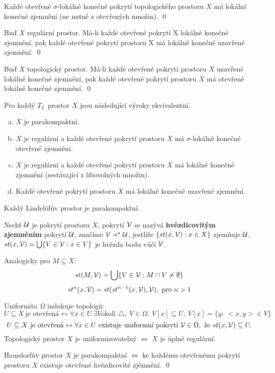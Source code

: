 \documentclass[12pt,a4paper]{article}
\newcommand{\head}[1]{\medskip\noindent {\bf #1}}
\newcommand\Hausd{$T_2$}
\begin{document}
\lemma[1] Každé otevřené $\sigma$-lokálně konečné pokrytí topologického
	prostoru $X$ má lokální konečné zjemnění (ne nutně z otevřených množin).
\dukaz \qed

\lemma[2] Buď $X$ regulární prostor. Má-li každé otevřené pokrytí X lokálně
	konečné zjemnění, pak každé otevřené pokrytí prostoru X má lokálně konečné
	uzavřené zjemnění.
\dukaz \qed

\lemma[3] Buď $X$ topologický prostor. Má-li každé otevřené pokrytí prostoru
	$X$ uzavřené lokálně konečné zjemnění, pak každé otevřené pokrytí prostoru
	$X$ má otevřené lokálně konečné zjemnění.
\dukaz \qed

\begin{veta}
Pro každý \Hausd~prostor $X$ jsou následující výroky ekvivalentní.
	\begin{enumerate}[(a)]
		\item $X$ je parakompaktní.
		\item $X$ je regulární a každé otevřené pokrytí prostoru $X$ má
			$\sigma$-lokálně konečné otevřené zjemnění.
		\item $X$ je regulární a každé otevřené pokrytí prostoru $X$ má lokálně
			konečné zjemnění (sestávající z libovolných množin).
		\item Každé otevřené pokrytí prostoru $X$ má lokálně konečné uzavřené
			zjemnění.
	\end{enumerate}
\end{veta}

\head {Důsledek:} Každý Lindelöfův prostor je parakompaktní.

 Nechť $\mathcal{ U }$ je pokrytí prostoru $X$, pokrytí $\mathcal{ V }$ se nazývá {\bf
	hvězdicovitým zjemněním} pokrytí $\mathcal{ U }$, značíme $\mathcal{ V } \prec^\star \mathcal{ U }$,
	jestliže $\{st(x,\mathcal{ V }) : x \in X\}$ zjemňuje $\mathcal{ U }$, $st(x, \mathcal{ V }) = \bigcup
	\{ V \in \mathcal{ V } : x \in V\}$ je hvězda bodu vůči $\mathcal{ V }$.

	Analogicky pro $M \subseteq X$:
		$$st(M, \mathcal{ V }) = \bigcup \{ V \in \mathcal{ V } : M \cap V \neq \emptyset \}$$
		$$st^n(x, \mathcal{ V }) = st(st^{n-1}(x, \mathcal{ V }), \mathcal{ V }),~\text{pro } n > 1$$

\head {Poznámka:} Uniformita $\Omega$ indukuje topologii:
	$$U \subseteq X~\text{je otevřená} \leftrightarrow \forall x \in U~\exists V \text{okolí } \triangle,~V \in \Omega,~V[x] \subseteq U,~V[x] = \{ y :~<x,y> \in V\}$$
	$$U \subseteq X~\text{je otevřená} \leftrightarrow \forall x \in U~\text{existuje uniformní pokrytí } \mathcal{ V } \in \Omega,\text{ že } st(x, \mathcal{ V }) \subseteq U.$$
	Topologický prostor $X$ je uniformizovatelný $\iff$ $X$ je úplně regulární.

\veta Hausdorfův prostor $X$ je parakompaktní $\iff$ ke každému otevřenému
	pokrytí prostoru $X$ existuje otevřené hvězdicovíté zjěmnění.
\dukaz \qed
\end{document}
